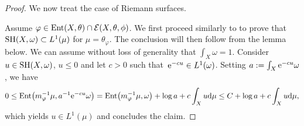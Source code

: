 \documentclass[pdftex]{sigma}
\numberwithin{equation}{section}
\theoremstyle{plain}
\newcommand \SH {{\rm SH}}
\newcommand \Ent{{\rm Ent}}
\begin{document}
\begin{proof}
We now treat the case of Riemann surfaces.

Assume $\varphi\in \Ent(X,\theta)\cap \mathcal{E}(X,\theta,\phi)$. We first proceed similarly to \cite[Lemma~3.16]{Trus20b} to prove that $\SH(X,\omega)\subset L^1(\mu)$ for $\mu=\theta_\varphi$. The conclusion will then follow from the lemma below. We can assume without loss of generality that $\int_X \omega=1$. Consider $u\in \SH(X,\omega)$, $u\leq 0$ and let $c>0$ such that~${{\rm e}^{-cu}\in L^1(\omega)}$. Setting $a:=\int_X {\rm e}^{-cu}\omega$, we have
\[
0\leq \Ent\big(m_\varphi^{-1}\mu, a^{-1}{\rm e}^{-cu}\omega\big)=\Ent\big(m_\varphi^{-1}\mu, \omega\big)+\log a+c\int_X u {\rm d}\mu\leq C+ \log a+c\int_X u {\rm d}\mu,
\]
which yields $u\in L^1(\mu)$ and concludes the claim.
 \end{proof}
\end{document}
